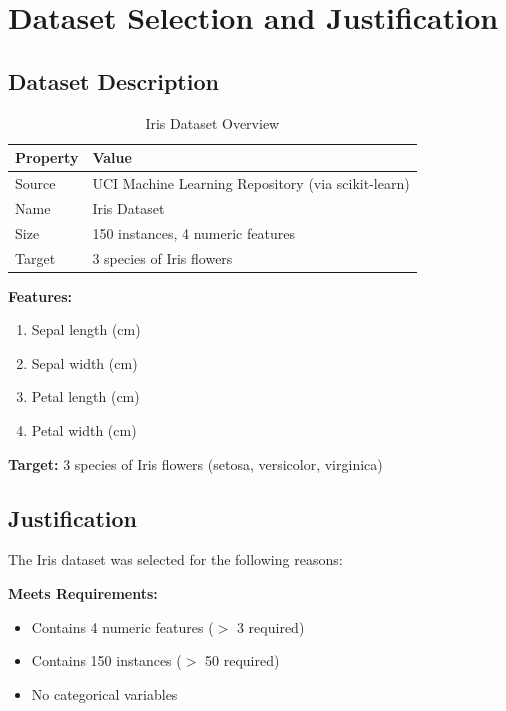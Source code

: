 \documentclass[12pt,a4paper]{article}
\begin{document}
\newpage

\section{Dataset Selection and Justification}

\subsection{Dataset Description}

\begin{table}[H]
\centering
\begin{tabular}{ll}
\toprule
\textbf{Property} & \textbf{Value} \\
\midrule
Source & UCI Machine Learning Repository (via scikit-learn) \\
Name & Iris Dataset \\
Size & 150 instances, 4 numeric features \\
Target & 3 species of Iris flowers \\
\bottomrule
\end{tabular}
\caption{Iris Dataset Overview}
\label{tab:dataset_overview}
\end{table}

\textbf{Features:}
\begin{enumerate}
    \item Sepal length (cm)
    \item Sepal width (cm)
    \item Petal length (cm)
    \item Petal width (cm)
\end{enumerate}

\textbf{Target:} 3 species of Iris flowers (setosa, versicolor, virginica)

\subsection{Justification}

The Iris dataset was selected for the following reasons:

\textbf{Meets Requirements:}
\begin{itemize}
    \item[$\checkmark$] Contains 4 numeric features ($>$ 3 required)
    \item[$\checkmark$] Contains 150 instances ($>$ 50 required)
    \item[$\checkmark$] No categorical variables
\end{itemize}
\end{document}
